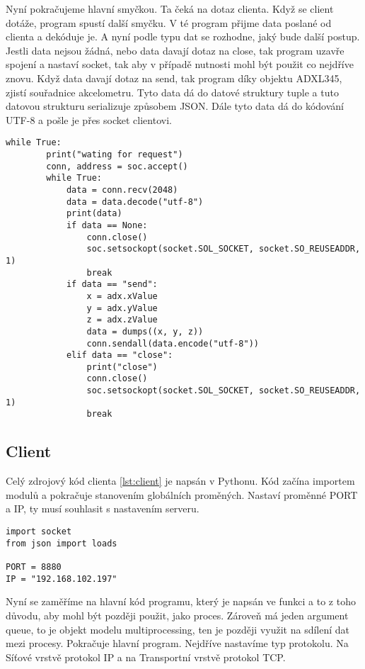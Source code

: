 \documentclass[12pt]{report}			%
\begin{document}
Nyní pokračujeme hlavní smyčkou. Ta čeká na dotaz clienta. Když se client dotáže, program spustí další smyčku. V té program přijme data poslané od clienta a dekóduje je. A nyní podle typu dat se rozhodne, jaký bude další postup. Jestli data nejsou žádná, nebo data davají dotaz na close, tak program uzavře spojení a nastaví socket, tak aby v případě nutnosti mohl být použit co nejdříve znovu. Když data davají dotaz na send, tak program díky objektu ADXL345, zjistí souřadnice akcelometru. Tyto data dá do datové struktury tuple a tuto datovou strukturu serializuje způsobem JSON. Dále tyto data dá do kódování UTF-8 a pošle je přes socket clientovi. 

\begin{lstlisting}[title={Program server.py}, caption={server.py}]
  while True:
        print("wating for request")
        conn, address = soc.accept()
        while True:
            data = conn.recv(2048)
            data = data.decode("utf-8")
            print(data)
            if data == None:
                conn.close()
                soc.setsockopt(socket.SOL_SOCKET, socket.SO_REUSEADDR, 1)
                break
            if data == "send":
                x = adx.xValue
                y = adx.yValue
                z = adx.zValue
                data = dumps((x, y, z))
                conn.sendall(data.encode("utf-8"))
            elif data == "close":
                print("close")
                conn.close()
                soc.setsockopt(socket.SOL_SOCKET, socket.SO_REUSEADDR, 1)
                break
\end{lstlisting}

\subsection{Client}

Celý zdrojový kód clienta \ref{lst:client} je napsán v Pythonu. Kód začína importem modulů a pokračuje stanovením globálních proměných. Nastaví proměnné PORT a IP, ty musí souhlasit s nastavením serveru. 
\begin{lstlisting}[title={Program client.py}, caption={client.py}]
import socket
from json import loads

PORT = 8880
IP = "192.168.102.197"
\end{lstlisting}

Nyní se zaměříme na hlavní kód programu, který je napsán ve funkci a to z toho důvodu, aby mohl být později použit, jako proces. Zároveň má jeden argument queue, to je objekt modelu multiprocessing, ten je později využit na sdílení dat mezi procesy. Pokračuje hlavní program. Nejdříve nastavíme typ protokolu. Na Síťové vrstvě protokol IP a na Transportní vrstvě protokol TCP. 
\end{document}
